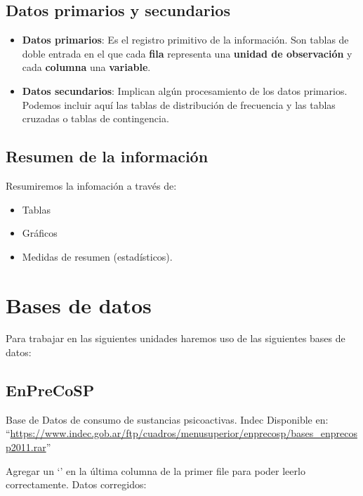 \documentclass[spanish,]{book}
\providecommand{\tightlist}{%
  \setlength{\itemsep}{0pt}\setlength{\parskip}{0pt}}
\begin{document}
\section{Datos primarios y
secundarios}\label{datos-primarios-y-secundarios}

\begin{itemize}
\item
  \textbf{Datos primarios}: Es el registro primitivo de la información.
  Son tablas de doble entrada en el que cada \textbf{fila} representa
  una \textbf{unidad de observación} y cada \textbf{columna} una
  \textbf{variable}.
\item
  \textbf{Datos secundarios}: Implican algún procesamiento de los datos
  primarios. Podemos incluir aquí las tablas de distribución de
  frecuencia y las tablas cruzadas o tablas de contingencia.
\end{itemize}

\section{Resumen de la información}\label{resumen-de-la-informacion}

Resumiremos la infomación a través de:

\begin{itemize}
\tightlist
\item
  Tablas
\item
  Gráficos
\item
  Medidas de resumen (estadísticos).
\end{itemize}

\chapter{Bases de datos}\label{bases-de-datos}

Para trabajar en las siguientes unidades haremos uso de las siguientes
bases de datos:

\section{EnPreCoSP}\label{enprecosp}

Base de Datos de consumo de sustancias psicoactivas. Indec Disponible
en:
``\url{https://www.indec.gob.ar/ftp/cuadros/menusuperior/enprecosp/bases_enprecosp2011.rar}''

Agregar un `\textbar{}' en la última columna de la primer file para
poder leerlo correctamente. Datos corregidos:
\end{document}
